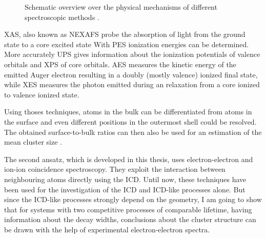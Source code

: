 \begin{figure}[h]
  \centering
  
  \caption{Schematic overview over the physical mechanisms of different
           spectroscopic methods \cite{Bjorneholm09}.}
  \label{figure:overview_spectroscopies}
\end{figure}

\ac{XAS}, also known as \ac{NEXAFS} probe the absorption of light
from the ground state to a core excited state With \ac{PES} ionization
energies can be determined. More accurately \ac{UPS} gives information
about the ionization potentials of valence orbitals and \ac{XPS}
of core orbitals.
\ac{AES} measures the kinetic energy of the emitted Auger electron
resulting in a doubly (mostly valence) ionized final state, while
\ac{XES} measures the photon emitted during an relaxation from
a core ionized to valence ionized state.

Using thoses techniques, atoms in the bulk can be differentiated from atoms
in the surface and even different positions in the
outermost shell could be resolved. The obtained surface-to-bulk ratios
can then also be used for an estimation of the mean cluster size
\cite{Bjorneholm09,Knop98,Hatsui05}.

The second ansatz, which is developed in this thesis, uses electron-electron
and ion-ion coincidence spectroscopy.
They exploit the interaction between neighbouring atoms
directly using the ICD.
Until now, these techniques
have been used for the investigation of the
\ac{ICD} and \ac{ICD}-like processes alone.
But since the ICD-like processes strongly depend on the geometry, I am going to
show that for systems with two competitive processes of comparable lifetime,
having information about the decay widths, conclusions about
the cluster structure can be drawn with the help of experimental
electron-electron spectra.

